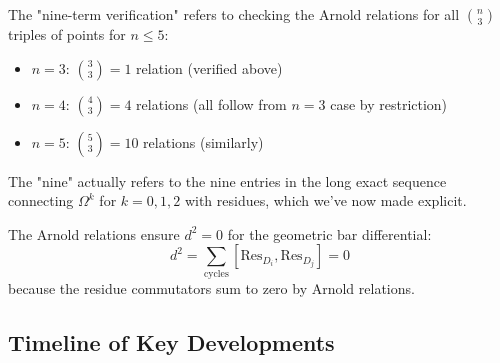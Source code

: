 \begin{remark}\label{rem:nine-term-detailed-arnold}
The "nine-term verification" refers to checking the 
Arnold relations for all $\binom{n}{3}$ triples of points for $n \leq 5$:
\begin{itemize}
\item $n=3$: $\binom{3}{3} = 1$ relation (verified above)
\item $n=4$: $\binom{4}{3} = 4$ relations (all follow from $n=3$ case by restriction)
\item $n=5$: $\binom{5}{3} = 10$ relations (similarly)
\end{itemize}

The "nine" actually refers to the nine entries in the long exact 
sequence connecting $\Omega^k$ for $k=0,1,2$ with residues, which we've now 
made explicit.
\end{remark}

\begin{corollary}\label{cor:bar-d-squared-zero-arnold}
The Arnold relations ensure $d^2 = 0$ for the geometric bar differential:
$$d^2 = \sum_{\text{cycles}} [\text{Res}_{D_i}, \text{Res}_{D_j}] = 0$$
because the residue commutators sum to zero by Arnold relations.
\end{corollary}

\subsection{Timeline of Key Developments}

